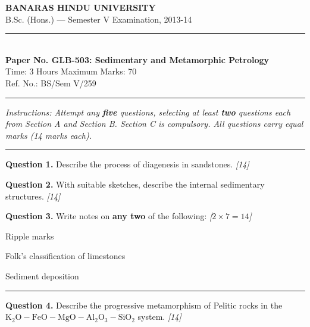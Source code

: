 \documentclass[11pt,a4paper]{article}
\newcommand{\pts}[1]{\hfill   \textit{[#1]}}
\begin{document}
\begin{center}
  {\large\bfseries BANARAS HINDU UNIVERSITY}\\[2pt]
  {\normalsize B.Sc. (Hons.) --- Semester V Examination, 2013-14}\\[6pt]
  \rule{0.8\linewidth}{0.5pt}\\[6pt]
  {\large\bfseries Paper No. GLB-503: Sedimentary and Metamorphic Petrology}\\[4pt]
  {\normalsize Time: 3 Hours \hfill Maximum Marks: 70}\\[2pt]
  {\small Ref. No.: BS/Sem V/259}
\end{center}
\rule{\linewidth}{0.4pt}
\smallskip



\noindent   \textit{Instructions: Attempt any   \textbf{five} questions, selecting at least   \textbf{two} questions each from Section A and Section B. Section C is compulsory. All questions carry equal marks (14 marks each).}
\bigskip

\bigskip


\rule{\linewidth}{0.4pt}\smallskip




\noindent   \textbf{Question 1.} Describe the process of diagenesis in sandstones. \pts{14}

\medskip


\noindent   \textbf{Question 2.} With suitable sketches, describe the internal sedimentary structures. \pts{14}

\medskip


\noindent   \textbf{Question 3.} Write notes on   \textbf{any two} of the following: \pts{$2  \times 7 = 14$}

\begin{parts}
  \item Ripple marks
  \item Folk's classification of limestones
  \item Sediment deposition
\end{parts}

\bigskip


\rule{\linewidth}{0.4pt}\smallskip




\noindent   \textbf{Question 4.} Describe the progressive metamorphism of Pelitic rocks in the $ \text{K}_2 \text{O}- \text{FeO}- \text{MgO}- \text{Al}_2 \text{O}_3- \text{SiO}_2$ system. \pts{14}
\end{document}
